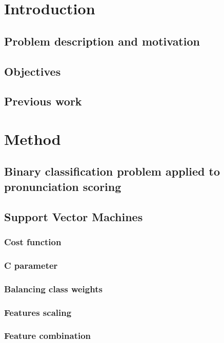 \documentclass[11pt,a4paper]{tesis}
\begin{document}
\tableofcontents
\chapter{Introduction}
	\section{Problem description and motivation}
	\section{Objectives}
	\section{Previous work}
\chapter{Method}
	\section{Binary classification problem applied to pronunciation scoring}
		
	\section{Support Vector Machines}
		
		\subsection{Cost function}
			
		\subsection{C parameter}
			
		\subsection{Balancing class weights}
			
		\subsection{Features scaling}
			
		\subsection{Feature combination}
			
\end{document}
